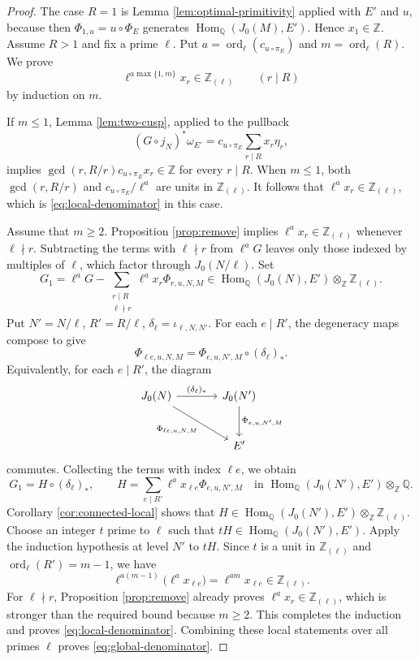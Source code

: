 \documentclass[12pt, letterpaper]{amsart}
\theoremstyle{definition}
\theoremstyle{remark}
\newcommand{\Q}{\mathbb Q}
\newcommand{\Z}{\mathbb Z}
\newcommand{\Hom}{\operatorname{Hom}}
\DeclareMathOperator{\ord}{ord}
\numberwithin{equation}{section}
\begin{document}
\begin{proof}
The case \(R=1\) is Lemma \ref{lem:optimal-primitivity} applied with
\(E'\) and \(u\), because then
\(\Phi_{1,u}=u\circ\Phi_E\) generates \(\Hom_\Q(J_0(M),E')\). Hence
\(x_1\in\Z\).
Assume \(R>1\) and fix a prime \(\ell\). Put
\(a=\ord_\ell(c_{u\circ\pi_E})\) and \(m=\ord_\ell(R)\). We prove
\begin{equation}\label{eq:local-denominator}
        \ell^{a\max\{1,m\}}x_r\in\Z_{(\ell)}
        \qquad(r\mid R)
\end{equation}
by induction on \(m\).

If \(m\le1\), Lemma \ref{lem:two-cusp}, applied to the pullback
\[
        (G\circ j_N)^*\omega_{E'}
        =
        c_{u\circ\pi_E}\sum_{r\mid R}x_r\eta_r ,
\]
implies \(\gcd(r,R/r)c_{u\circ\pi_E}x_r\in\Z\) for every \(r\mid R\). When
\(m\le1\), both \(\gcd(r,R/r)\) and
\(c_{u\circ\pi_E}/\ell^a\) are units in \(\Z_{(\ell)}\). It follows that
\(\ell^ax_r\in\Z_{(\ell)}\), which is \eqref{eq:local-denominator} in this
case.

Assume that \(m\ge2\). Proposition \ref{prop:remove} implies
\(\ell^ax_r\in\Z_{(\ell)}\) whenever \(\ell\nmid r\).
Subtracting the terms with \(\ell\nmid r\) from \(\ell^aG\)
leaves only those indexed by multiples of \(\ell\), which factor through
\(J_0(N/\ell)\). Set
\[
        G_1=
        \ell^aG-
        \sum_{\substack{r\mid R\\ \ell\nmid r}}\ell^ax_r\Phi_{r,u,N,M}
        \in\Hom_\Q(J_0(N),E')\otimes_\Z\Z_{(\ell)}.
\]
Put \(N'=N/\ell\), \(R'=R/\ell\),
\(\delta_\ell=\iota_{\ell,N,N'}\).
For each \(e\mid R'\), the degeneracy maps compose to give
\[
        \Phi_{\ell e,u,N,M}
        =
        \Phi_{e,u,N',M}\circ(\delta_\ell)_*.
\]
Equivalently, for each \(e\mid R'\), the diagram
\[
\begin{tikzcd}[column sep=large,row sep=large]
J_0(N) \arrow[r,"(\delta_\ell)_*"] \arrow[dr,swap,"\Phi_{\ell e,u,N,M}"] &
J_0(N') \arrow[d,"\Phi_{e,u,N',M}"] \\
& E'
\end{tikzcd}
\]
commutes.
Collecting the terms with index \(\ell e\), we obtain
\[
        G_1=H\circ(\delta_\ell)_*,
        \qquad
        H=\sum_{e\mid R'}\ell^ax_{\ell e}\Phi_{e,u,N',M}
        \quad\text{in }\Hom_\Q(J_0(N'),E')\otimes_\Z\Q.
\]
Corollary \ref{cor:connected-local} shows that
\(H\in\Hom_\Q(J_0(N'),E')\otimes_\Z\Z_{(\ell)}\).
Choose an integer \(t\) prime to \(\ell\) such that
\(tH\in\Hom_\Q(J_0(N'),E')\). Apply the induction hypothesis at level \(N'\)
to \(tH\). Since \(t\) is a unit in \(\Z_{(\ell)}\) and
\(\ord_\ell(R')=m-1\), we have
\[
        \ell^{a(m-1)}\bigl(\ell^ax_{\ell e}\bigr)
        =\ell^{am}x_{\ell e}\in\Z_{(\ell)}.
\]
For \(\ell\nmid r\), Proposition \ref{prop:remove} already proves
\(\ell^ax_r\in\Z_{(\ell)}\), which is stronger than the required bound because
\(m\ge2\). This completes the induction and proves
\eqref{eq:local-denominator}. Combining these local statements over all
primes \(\ell\) proves \eqref{eq:global-denominator}.
\end{proof}
\end{document}

